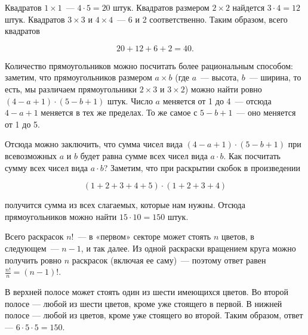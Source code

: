 ﻿
\begin{itemize}
\itA Квадратов $1 \times 1$~— $4 \cdot 5 = 20$ штук. Квадратов размером $2 \times 2$ найдется $3 \cdot 4 = 12$ штук. Квадратов $3 \times 3$ и $4 \times 4$~— 6 и 2 соответственно. Таким образом, всего квадратов

$$20 + 12 + 6 + 2 = 40.$$

Количество прямоугольников можно посчитать более рациональным способом: заметим, что прямоугольников размером $a \times b$ (где $a$~— высота, $b$~— ширина, то есть, мы различаем прямоугольники $2 \times 3$ и $3 \times 2$) можно найти ровно $(4-a+1) \cdot (5-b+1)$ штук. Число $a$ меняется от 1 до 4~— отсюда $4-a+1$ меняется в тех же пределах. То же самое с $5-b+1$~— оно меняется от 1 до 5.

\ms Отсюда можно заключить, что сумма чисел вида $(4-a+1) \cdot (5-b+1)$ при всевозможных $a$ и $b$ будет равна сумме всех чисел вида $a \cdot b$. Как посчитать сумму всех чисел вида $a \cdot b$? Заметим, что при раскрытии скобок в произведении

$$(1+2+3+4+5) \cdot (1+2+3+4)$$

получится сумма из всех слагаемых, которые нам нужны. Отсюда прямоугольников можно найти $15 \cdot 10 = 150$ штук.

\itB \label{mgap-ba} Всего раскрасок $n!$~— в «первом» секторе может стоять $n$ цветов, в следующем~— $n-1$, и так далее. Из одной раскраски вращением круга можно получить ровно $n$ раскрасок (включая ее саму)~— поэтому ответ равен $\tfrac{n!}{n} = (n-1)!$.

\itC В верхней полосе может стоять один из шести имеющихся цветов. Во второй полосе — любой из шести цветов, кроме уже стоящего в первой. В нижней полосе — любой из цветов, кроме уже стоящего во второй. Таким образом, ответ — $6 \cdot 5 \cdot 5 = 150$.
\end{itemize}